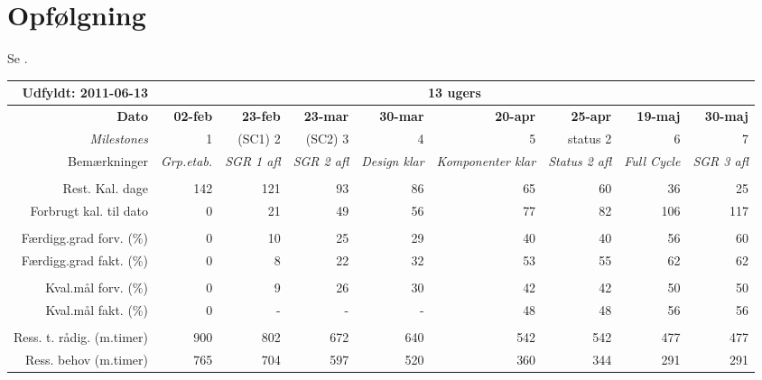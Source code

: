 \section{Opfølgning}
Se .
\begin{sidewaystable}[!htbp]
\begin{footnotesize}
    \begin{tabular}{r|rrrrrrrr}
Udfyldt: 2011-06-13    & \multicolumn{8}{c}{13 ugers} \\ \hline
    \textbf{Dato} & \textbf{02-feb} & \textbf{23-feb} & \textbf{23-mar} & \textbf{30-mar} & \textbf{20-apr} & \textbf{25-apr} & \textbf{19-maj} & \textbf{30-maj} \\
    \textit{Milestones} & 1     & (SC1) 2 & (SC2) 3 & 4     & 5     & status 2 & 6     & 7 \\
    Bemærkninger & \textit{Grp.etab.} & \multicolumn{1}{l}{\textit{SGR 1 afl}} & \multicolumn{1}{l}{\textit{SGR 2 afl}} & \textit{Design klar} & \textit{Komponenter klar} & \textit{Status 2 afl} & \textit{Full Cycle} & \multicolumn{1}{l}{\textit{SGR 3 afl}} \\
          &       &       &       &       &       &       &       & \\
    Rest. Kal. dage & 142   & 121   & 93    & 86    & 65    & 60    & 36    & 25 \\
    Forbrugt kal. til dato & 0     & 21    & 49    & 56    & 77    & 82    & 106    & 117 \\
          &       &       &       &       &       &       &       & \\
    Færdigg.grad forv. (\%) & 0     & 10    & 25    & 29    & 40    & 40    & 56    & 60 \\
    Færdigg.grad fakt. (\%) & 0     & 8     & 22    & 32    & 53    & 55    & 62    & 62 \\
          &       &       &       &       &       &       &       & \\
    Kval.mål forv. (\%) & 0     & 9    & 26    & 30    & 42    & 42    & 50    & 50 \\
    Kval.mål fakt. (\%) & 0     & -   & -   & -   & 48  & 48    & 56    & 56 \\
          &       &       &       &       &       &       &       & \\
    Ress. t. rådig. (m.timer) & 900   & 802   & 672   & 640   & 542   & 542   & 477   & 477 \\
    Ress. behov (m.timer) & 765   & 704 & 597 & 520   & 360   & 344   & 291   & 291 \\

\end{tabular}
\end{footnotesize}
\end{sidewaystable}
